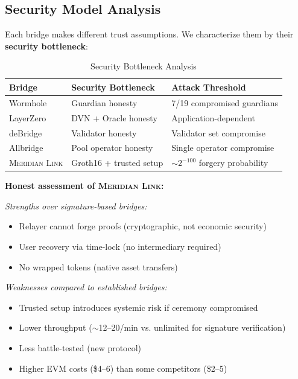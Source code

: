 \documentclass[11pt,a4paper,twoside]{article}
\newcommand{\protocol}{\textsc{Meridian Link}}
\begin{document}
\subsection{Security Model Analysis}

Each bridge makes different trust assumptions. We characterize them by their \textbf{security bottleneck}:

\begin{table}[H]
\centering
\caption{Security Bottleneck Analysis}
\label{tab:security-bottleneck}
\begin{tabular}{@{}lll@{}}
\toprule
\textbf{Bridge} & \textbf{Security Bottleneck} & \textbf{Attack Threshold} \\
\midrule
Wormhole & Guardian honesty & 7/19 compromised guardians \\
LayerZero & DVN + Oracle honesty & Application-dependent \\
deBridge & Validator honesty & Validator set compromise \\
Allbridge & Pool operator honesty & Single operator compromise \\
\protocol{} & Groth16 + trusted setup & $\sim 2^{-100}$ forgery probability \\
\bottomrule
\end{tabular}
\end{table}

\textbf{Honest assessment of \protocol{}:}

\textit{Strengths over signature-based bridges:}
\begin{itemize}
    \item Relayer cannot forge proofs (cryptographic, not economic security)
    \item User recovery via time-lock (no intermediary required)
    \item No wrapped tokens (native asset transfers)
\end{itemize}

\textit{Weaknesses compared to established bridges:}
\begin{itemize}
    \item Trusted setup introduces systemic risk if ceremony compromised
    \item Lower throughput ($\sim$12--20/min vs. unlimited for signature verification)
    \item Less battle-tested (new protocol)
    \item Higher EVM costs (\$4--6) than some competitors (\$2--5)
\end{itemize}
\end{document}
